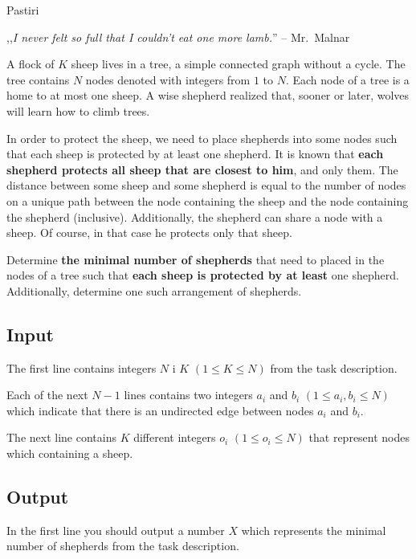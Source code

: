 \begin{statement}[
  problempoints=100,
  timelimit=1 second,
  memorylimit=512 MiB,
]{Pastiri}

,,\textit{I never felt so full that I couldn't eat one more lamb.}'' --
Mr.\ Malnar

A flock of $K$ sheep lives in a tree, a simple connected graph without
a cycle. The tree contains $N$ nodes denoted with integers from $1$ to $N$.
Each node of a tree is a home to at most one sheep. A wise shepherd realized
that, sooner or later, wolves will learn how to climb trees.

In order to protect the sheep, we need to place shepherds into some nodes
such that each sheep is protected by at least one shepherd. It is known that
\textbf{each shepherd protects all sheep that are closest to him}, and only them.
The distance between some sheep and some shepherd is equal to the number of
nodes on a unique path between the node containing the sheep and the node
containing the shepherd (inclusive). Additionally, the shepherd can share a
node with a sheep. Of course, in that case he protects only that sheep.

Determine \textbf{the minimal number of shepherds} that need to placed in
the nodes of a tree such that \textbf{each sheep is protected by at least}
one shepherd. Additionally, determine one such arrangement of shepherds.

\subsection*{Input}
The first line contains integers $N$ i $K$ $(1 \le K \le N)$ from the task
description.

Each of the next $N-1$ lines contains two integers $a_i$ and $b_i$ $(1 \le
a_i, b_i \le N)$ which indicate that there is an undirected edge between
nodes $a_i$ and $b_i$.

The next line contains $K$ different integers $o_i$ $(1 \le o_i \le N)$ that
represent nodes which containing a sheep.

\subsection*{Output}
In the first line you should output a number $X$ which represents the minimal
number of shepherds from the task description.


\end{statement}
